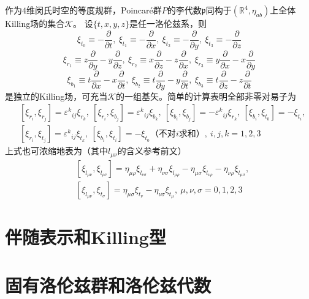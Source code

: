 \begin{example}
    作为$4$维闵氏时空的等度规群，Poincaré群$P$的李代数$\mathfrak{p}$同构于$(\mathbb{R}^4, \eta_{ab})$上全体Killing场的集合$\mathscr{K}$。
    设$\{t, x, y, z\}$是任一洛伦兹系，则
    $$\xi_{t_0} \equiv -\frac{\partial}{\partial t}, ~ \xi_{t_1} \equiv -\frac{\partial}{\partial x}, ~ \xi_{t_2} \equiv -\frac{\partial}{\partial y}, ~ \xi_{t_3} \equiv -\frac{\partial}{\partial z}$$
    $$\xi_{r_1} \equiv z\frac{\partial}{\partial y} - y\frac{\partial}{\partial z}, ~ \xi_{r_2} \equiv x\frac{\partial}{\partial z} - z\frac{\partial}{\partial x}, ~ \xi_{r_3} \equiv y\frac{\partial}{\partial x} - x\frac{\partial}{\partial y}$$
    $$\xi_{b_1} \equiv t\frac{\partial}{\partial x} - x\frac{\partial}{\partial t}, ~ \xi_{b_2} \equiv t\frac{\partial}{\partial y} - y\frac{\partial}{\partial t}, ~ \xi_{b_3} \equiv t\frac{\partial}{\partial z} - z\frac{\partial}{\partial t}$$
    是独立的Killing场，可充当$\mathscr{K}$的一组基矢。简单的计算表明全部非零对易子为
    \[\begin{split}
        & [\xi_{r_i}, \xi_{r_j}] = \varepsilon^k{}_{ij}\xi_{r_k}, ~ [\xi_{r_i}, \xi_{b_j}] = \varepsilon^k{}_{ij}\xi_{b_k}, ~ [\xi_{b_i}, \xi_{b_j}] = -\varepsilon^k{}_{ij}\xi_{r_k}, ~ [\xi_{b_i}, \xi_{t_0}] = -\xi_{t_i}, \\
        & [\xi_{r_i}, \xi_{t_j}] = \varepsilon^k{}_{ij}\xi_{t_k}, ~ [\xi_{b_i}, \xi_{t_i}] = -\xi_{t_0} \text{（不对$i$求和）}, ~ i, j, k = 1, 2, 3
    \end{split}\]
    上式也可浓缩地表为（其中$l_{\mu\nu}$的含义参考前文）
    \[\begin{split}
        & [\xi_{l_{\mu\nu}}, \xi_{l_{\rho\sigma}}] = \eta_{\mu\rho}\xi_{l_{\nu\sigma}} + \eta_{\nu\sigma}\xi_{l_{\mu\rho}} - \eta_{\mu\sigma}\xi_{l_{\nu\rho}} - \eta_{\nu\rho}\xi_{l_{\mu\sigma}}, \\
        & [\xi_{l_{\mu\nu}}, \xi_{t_\sigma}] = \eta_{\mu\sigma}\xi_{t_\nu} - \eta_{\nu\sigma}\xi_{t_\mu}, ~ \mu, \nu, \sigma = 0, 1, 2, 3
    \end{split}\]
\end{example}

\section{伴随表示和Killing型}

\iffalse

\section{固有洛伦兹群和洛伦兹代数}

